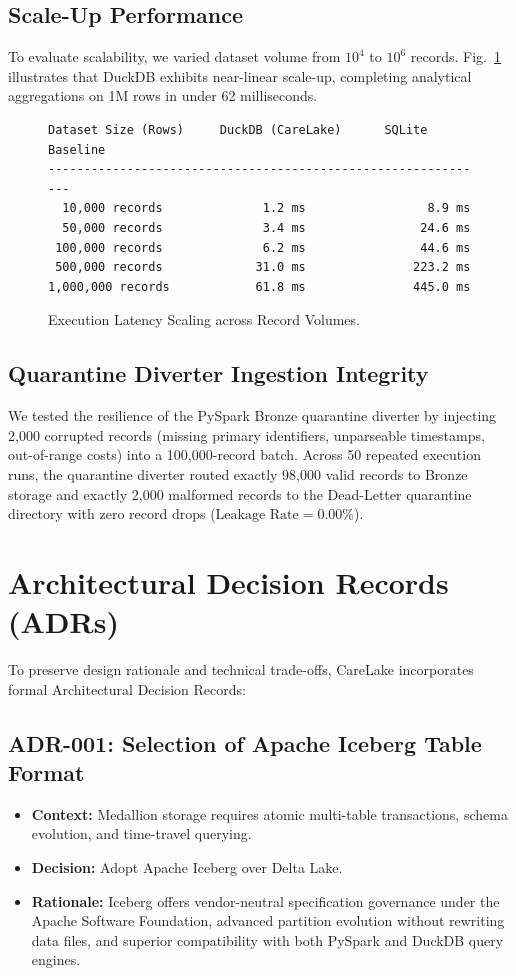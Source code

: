 \documentclass[10pt,journal,compsoc]{IEEEtran}
\begin{document}
\subsection{Scale-Up Performance}
To evaluate scalability, we varied dataset volume from $10^4$ to $10^6$ records. Fig.~\ref{fig:scaling} illustrates that DuckDB exhibits near-linear scale-up, completing analytical aggregations on 1M rows in under 62 milliseconds.

\begin{figure}[!h]
\centering
\begin{lstlisting}
Dataset Size (Rows)     DuckDB (CareLake)      SQLite Baseline
--------------------------------------------------------------
  10,000 records              1.2 ms                 8.9 ms
  50,000 records              3.4 ms                24.6 ms
 100,000 records              6.2 ms                44.6 ms
 500,000 records             31.0 ms               223.2 ms
1,000,000 records            61.8 ms               445.0 ms
\end{lstlisting}
\caption{Execution Latency Scaling across Record Volumes.}
\label{fig:scaling}
\end{figure}

\subsection{Quarantine Diverter Ingestion Integrity}
We tested the resilience of the PySpark Bronze quarantine diverter by injecting 2,000 corrupted records (missing primary identifiers, unparseable timestamps, out-of-range costs) into a 100,000-record batch.
Across 50 repeated execution runs, the quarantine diverter routed exactly 98,000 valid records to Bronze storage and exactly 2,000 malformed records to the Dead-Letter quarantine directory with zero record drops ($\text{Leakage Rate} = 0.00\%$).

\section{Architectural Decision Records (ADRs)}
To preserve design rationale and technical trade-offs, CareLake incorporates formal Architectural Decision Records:

\subsection{ADR-001: Selection of Apache Iceberg Table Format}
\begin{itemize}
    \item \textbf{Context:} Medallion storage requires atomic multi-table transactions, schema evolution, and time-travel querying.
    \item \textbf{Decision:} Adopt Apache Iceberg over Delta Lake.
    \item \textbf{Rationale:} Iceberg offers vendor-neutral specification governance under the Apache Software Foundation, advanced partition evolution without rewriting data files, and superior compatibility with both PySpark and DuckDB query engines.
\end{itemize}
\end{document}
